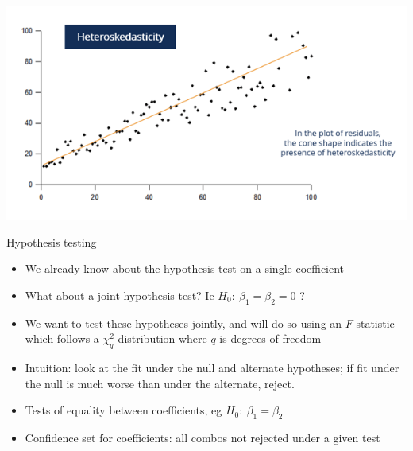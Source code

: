 \documentclass[aspectratio=169]{beamer}
\begin{document}
\begin{frame}
    \centering
    \includegraphics[width = .75\textwidth,keepaspectratio]{./figs/heteroskedasticity.png}
\end{frame}

\begin{frame}{Hypothesis testing}
    \begin{itemize}
        \item We already know about the hypothesis test on a single coefficient
        \item What about a joint hypothesis test? Ie $H_0:~\beta_1 = \beta_2 = 0$ ?
        \item We want to test these hypotheses jointly, and will do so using an $F$-statistic which follows a $\chi^2_q$ distribution where $q$ is degrees of freedom
        \item Intuition: look at the fit under the null and alternate hypotheses; if fit under the null is much worse than under the alternate, reject.
        \item Tests of equality between coefficients, eg $H_0:~\beta_1 = \beta_2$
        \item Confidence set for coefficients: all combos not rejected under a given test
    \end{itemize}
\end{frame}
\end{document}
